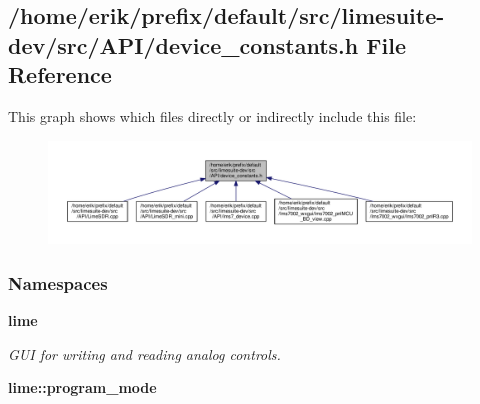 \subsection{/home/erik/prefix/default/src/limesuite-\/dev/src/\+A\+P\+I/device\+\_\+constants.h File Reference}
\label{device__constants_8h}
This graph shows which files directly or indirectly include this file\+:
\nopagebreak
\begin{figure}[H]
\begin{center}
\leavevmode
\includegraphics[width=350pt]{d0/ddb/device__constants_8h__dep__incl}
\end{center}
\end{figure}
\subsubsection*{Namespaces}
\begin{DoxyCompactItemize}
\item 
 {\bf lime}
\begin{DoxyCompactList}\small\item\em G\+UI for writing and reading analog controls. \end{DoxyCompactList}\item 
 {\bf lime\+::program\+\_\+mode}
\end{DoxyCompactItemize}
